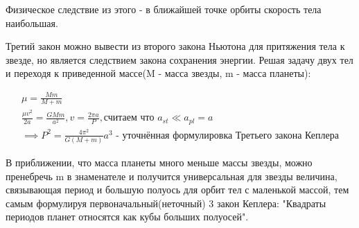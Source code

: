 Физическое следствие из этого - в ближайшей точке орбиты скорость тела наибольшая.

Третий закон можно вывести из второго закона Ньютона для притяжения тела к звезде, но является следствием закона сохранения энергии. Решая задачу двух тел и переходя к приведенной массе(M - масса звезды, m - масса планеты):

\begin{eqnarray}
\mu = \frac{Mm}{M + m}
\label{eq:3_reduced_mass}
\\
\frac{ \mu v^2 }{2 a} = \frac{GMm}{a^2}, v = \frac{2 \pi a}{P}, \text{считаем что $a_{st} \ll a_{pl} = a$}
\label{eq:3_newton}
\\
\implies P^2 = \frac{4 \pi^2}{G(M + m)} a^3 \text{ - уточнённая формулировка Третьего закона Кеплера}
\label{eq:3_kepler_third}
\end{eqnarray}

В приближении, что масса планеты много меньше массы звезды, можно пренебречь m в знаменателе и получится универсальная для звезды величина, связывающая период и большую полуось для орбит тел с маленькой массой, тем самым формулируя первоначальный(неточный) 3 закон Кеплера: "Квадраты периодов планет относятся как кубы больших полуосей".

